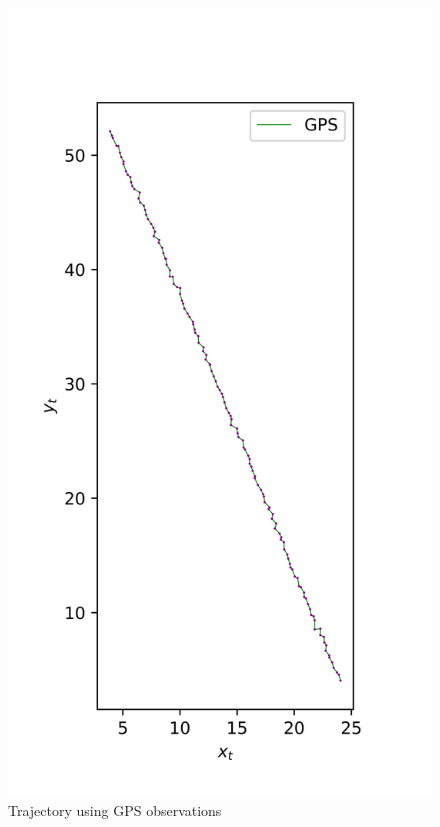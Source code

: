 \begin{figure}[H]
\begin{minipage}{0.32\linewidth}
        \centering
        \includegraphics[width=1.2\linewidth]{plots/part2-e-GPS.png}
        \caption*{Trajectory using GPS observations}
    \end{minipage}
    \hfill
    \begin{minipage}{0.32\linewidth}
        \centering

\end{minipage}
\end{figure}
